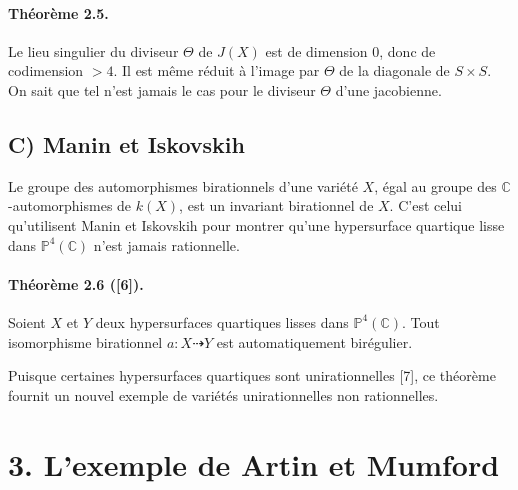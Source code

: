 \documentclass[10pt]{article}
\newcommand{\C}{\mathbb C}
\newcommand{\Pj}{\mathbb P}
\begin{document}
\paragraph{Théorème 2.5.} Le lieu singulier du diviseur \(\Theta\) de \(J(X)\) est de dimension \(0\), donc de codimension \(>4\). Il est même réduit à l'image par \(\Theta\) de la diagonale de \(S\times S\). On sait que tel n'est jamais le cas pour le diviseur \(\Theta\) d'une jacobienne.

\subsection*{C) Manin et Iskovskih}

Le groupe des automorphismes birationnels d'une variété \(X\), égal au groupe des \(\C\)-automorphismes de \(k(X)\), est un invariant birationnel de \(X\). C'est celui qu'utilisent Manin et Iskovskih pour montrer qu'une hypersurface quartique lisse dans \(\Pj^4(\C)\) n'est jamais rationnelle.

\paragraph{Théorème 2.6 ([6]).} Soient \(X\) et \(Y\) deux hypersurfaces quartiques lisses dans \(\Pj^4(\C)\). Tout isomorphisme birationnel \(a:X\dashrightarrow Y\) est automatiquement birégulier.

Puisque certaines hypersurfaces quartiques sont unirationnelles [7], ce théorème fournit un nouvel exemple de variétés unirationnelles non rationnelles.

\section*{3. L'exemple de Artin et Mumford}
\end{document}
